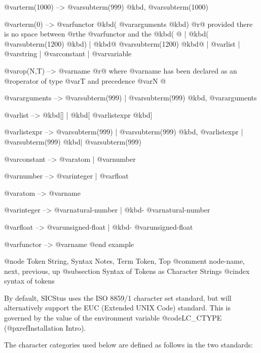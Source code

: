 {{@var{term(1000)}        --> @var{subterm(999)} @kbd{,} @var{subterm(1000)}

@var{term(0)}           --> @var{functor} @kbd{(} @var{arguments} @kbd{)}
                         @r{@{ provided there is no space between}
                           @r{the @var{functor} and the @kbd{(} @}}
                   |  @kbd{(} @var{subterm(1200)} @kbd{)}
                   |  @kbd{@{} @var{subterm(1200)} @kbd{@}}
                   |  @var{list}
                   |  @var{string}
                   |  @var{constant}
                   |  @var{variable}

@var{op(N,T)}           --> @var{name}
                         @r{@{ where @var{name} has been declared as an}
                           @r{operator of type @var{T} and precedence @var{N} @}}

@var{arguments}         --> @var{subterm(999)}
                   |  @var{subterm(999)} @kbd{,} @var{arguments}

@var{list}              --> @kbd{[]}
                   |  @kbd{[} @var{listexpr} @kbd{]}

@var{listexpr}          --> @var{subterm(999)}
                   |  @var{subterm(999)} @kbd{,} @var{listexpr}
                   |  @var{subterm(999)} @kbd{|} @var{subterm(999)}

@var{constant}          --> @var{atom} | @var{number}

@var{number}            --> @var{integer} | @var{float}

@var{atom}              --> @var{name}

@var{integer}           --> @var{natural-number}
                   |  @kbd{-} @var{natural-number}

@var{float}             --> @var{unsigned-float}
                   |  @kbd{-} @var{unsigned-float}

@var{functor}           --> @var{name}
@end example

@node Token String, Syntax Notes, Term Token, Top
@comment  node-name,  next,  previous,  up
@subsection Syntax of Tokens as Character Strings
@cindex syntax of tokens

By default, SICStus uses the ISO 8859/1 character set standard, but will
alternatively support the EUC (Extended UNIX Code) standard.  This is
governed by the value of the environment variable @code{LC_CTYPE}
(@pxref{Installation Intro}).

The character categories used below are defined as follows in the two
standards:

}}

